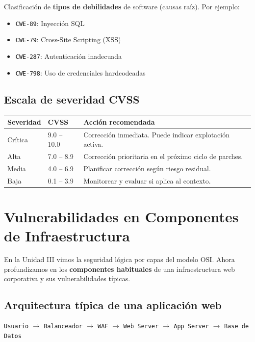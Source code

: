 \documentclass[11pt,a4paper]{article}
\begin{document}
\begin{definicion}
Clasificación de \textbf{tipos de debilidades} de software (causas raíz). Por ejemplo:
\begin{itemize}[leftmargin=*]
  \item \texttt{CWE-89}: Inyección SQL
  \item \texttt{CWE-79}: Cross-Site Scripting (XSS)
  \item \texttt{CWE-287}: Autenticación inadecuada
  \item \texttt{CWE-798}: Uso de credenciales hardcodeadas
\end{itemize}
\end{definicion}

\subsection{Escala de severidad CVSS}
\begin{center}
\renewcommand{\arraystretch}{1.3}
\begin{tabularx}{0.8\textwidth}{@{} p{3cm} p{2cm} X @{}}
\toprule
\textbf{Severidad} & \textbf{CVSS} & \textbf{Acción recomendada} \\
\midrule
Crítica & 9.0 -- 10.0 & Corrección inmediata. Puede indicar explotación activa. \\
Alta & 7.0 -- 8.9 & Corrección prioritaria en el próximo ciclo de parches. \\
Media & 4.0 -- 6.9 & Planificar corrección según riesgo residual. \\
Baja & 0.1 -- 3.9 & Monitorear y evaluar si aplica al contexto. \\
\bottomrule
\end{tabularx}
\end{center}

\section{Vulnerabilidades en Componentes de Infraestructura}

En la Unidad III vimos la seguridad lógica por capas del modelo OSI. Ahora profundizamos en los \textbf{componentes habituales} de una infraestructura web corporativa y sus vulnerabilidades típicas.

\subsection{Arquitectura típica de una aplicación web}
\begin{center}
\texttt{Usuario} $\rightarrow$ \texttt{Balanceador} $\rightarrow$ \texttt{WAF} $\rightarrow$ \texttt{Web Server} $\rightarrow$ \texttt{App Server} $\rightarrow$ \texttt{Base de Datos}
\end{center}
\end{document}
